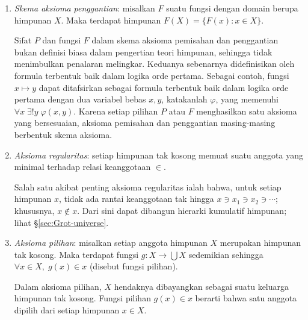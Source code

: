 \begin{enumerate}[\bfseries {A}.1]
		Apakah yang dimaksud dengan himpunan tak hingga? Karakterisasi sifat ini tidak langsung tampak. Dalam bahasa formal, aksioma ketakhinggaan dapat ditulis sebagai
		\begin{gather}\label{eqn:infinity-axiom}
			\exists x \bigl[ (\emptyset \in x) \;\wedge \;\forall y \in x \left(y \cup \{y\} \in x \right)  \bigr].
		\end{gather}
		Himpunan $x$ semacam ini disebut himpunan induktif. Tujuan mengandaikan keberadaan himpunan induktif ialah mengambil darinya subhimpunan
		\[ \left\{\emptyset, \{\emptyset\}, \{  \emptyset, \{\emptyset\}\}, \{  \emptyset, \{\emptyset\}, \{  \emptyset, \{\emptyset\}\}\}, \ldots \right\}, \]
		yaitu ordinal tak hingga terhitung $\omega$ yang akan segera kita konstruksi.
	\item \emph{Skema aksioma penggantian}: misalkan $F$ suatu fungsi dengan domain berupa himpunan $X$. Maka terdapat himpunan $F(X) = \{ F(x) : x \in X\}$.
	
		Sifat $P$ dan fungsi $F$ dalam skema aksioma pemisahan dan penggantian bukan definisi biasa dalam pengertian teori himpunan, sehingga tidak menimbulkan penalaran melingkar. Keduanya sebenarnya didefinisikan oleh formula terbentuk baik dalam logika orde pertama. Sebagai contoh, fungsi $x \mapsto y$ dapat ditafsirkan sebagai formula terbentuk baik dalam logika orde pertama dengan dua variabel bebas $x,y$, katakanlah $\varphi$, yang memenuhi $\forall x\; \exists! y\; \varphi(x,y)$. Karena setiap pilihan $P$ atau $F$ menghasilkan satu aksioma yang bersesuaian, aksioma pemisahan dan penggantian masing-masing berbentuk skema aksioma.
	\item \emph{Aksioma regularitas}: setiap himpunan tak kosong memuat suatu anggota yang minimal terhadap relasi keanggotaan $\in$.
	
		Salah satu akibat penting aksioma regularitas ialah bahwa, untuk setiap himpunan $x$, tidak ada rantai keanggotaan tak hingga $x \ni x_1 \ni x_2 \ni \cdots$; khususnya, $x \notin x$. Dari sini dapat dibangun hierarki kumulatif himpunan; lihat \S\ref{sec:Grot-universe}.
	\item \emph{Aksioma pilihan}: misalkan setiap anggota himpunan $X$ merupakan himpunan tak kosong. Maka terdapat fungsi $g: X \to \bigcup X$ sedemikian sehingga $\forall x \in X, \; g(x) \in x$ (disebut fungsi pilihan).

		Dalam aksioma pilihan, $X$ hendaknya dibayangkan sebagai suatu keluarga himpunan tak kosong. Fungsi pilihan $g(x) \in x$ berarti bahwa satu anggota dipilih dari setiap himpunan $x \in X$.
\end{enumerate}

